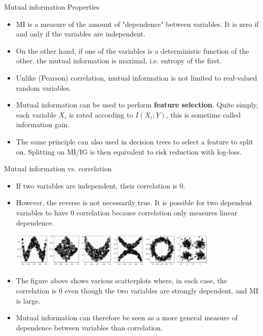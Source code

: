 \begin{vbframe} {Mutual information Properties}
\begin{itemize}
  \item MI is a measure of the amount of "dependence" between variables. It is zero if and only if the variables are independent.
  \item On the other hand, if one of the variables is a deterministic function of the other, the mutual information is maximal, i.e. entropy of the first.
 \item Unlike (Pearson) correlation, mutual information is not limited to real-valued random variables.
    \item Mutual information can be used to perform \textbf{feature selection}. Quite simply, each variable $X_i$ is rated according to $I(X_i;Y)$, this is sometime called information gain.
  \item The same principle can also used in decision trees to select a feature to split on. Splitting on MI/IG is then equivalent to risk reduction with log-loss. 
\end{itemize}
\end{vbframe}
 

\begin{vbframe} {Mutual information vs. correlation}
  
  \begin{itemize}
    \item If two variables are independent, their correlation is 0.
    \item However, the reverse is not necessarily true. It is possible for two dependent variables to have 0 correlation because correlation only measures linear dependence.
    
\begin{center}
\includegraphics[width = 10cm ]{figure/correlation_plot.png} \\
\end{center}

    \item The figure above shows various scatterplots where, in each case, the correlation is 0 even though the two variables are strongly dependent, and MI is large. 
    \item Mutual information can therefore be seen as a more general measure of dependence between variables than correlation.
  \end{itemize}

\end{vbframe}

